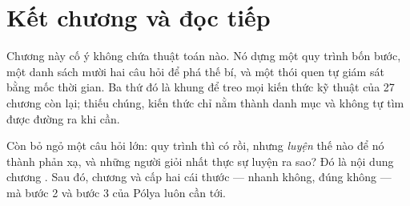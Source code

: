 \documentclass[../../algorithm.tex]{subfiles}
\begin{document}
\section*{Kết chương và đọc tiếp}

Chương này cố ý không chứa thuật toán nào. Nó dựng một quy trình bốn bước, một danh sách mười hai câu hỏi để phá thế bí, và một thói quen tự giám sát bằng mốc thời gian. Ba thứ đó là khung để treo mọi kiến thức kỹ thuật của 27 chương còn lại; thiếu chúng, kiến thức chỉ nằm thành danh mục và không tự tìm được đường ra khi cần.

Còn bỏ ngỏ một câu hỏi lớn: quy trình thì có rồi, nhưng \emph{luyện} thế nào để nó thành phản xạ, và những người giỏi nhất thực sự luyện ra sao? Đó là nội dung chương . Sau đó, chương  và  cấp hai cái thước --- nhanh không, đúng không --- mà bước 2 và bước 3 của Pólya luôn cần tới.
\ifSubfilesClassLoaded{\printbibliography[title={Nguồn}]}{}
\end{document}

